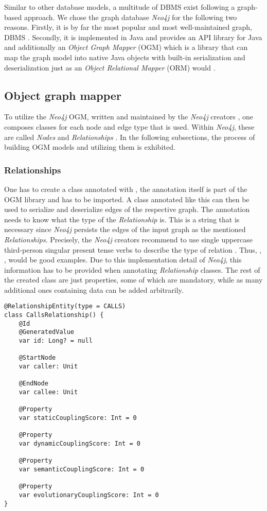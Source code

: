 \documentclass[12pt,a4paper]{report}
\begin{document}
Similar to other database models, a multitude of DBMS exist following a graph\hyp
based approach. We chose the graph database \textit{Neo4j} for the following
two reasons. Firstly, it is by far the most popular and most well-maintained
graph, DBMS \cite{graph-dbms-ranking}. Secondly, it is implemented in Java and
provides an API library for Java and additionally an \textit{Object Graph
Mapper} (OGM) which is a library that can map the graph model into native Java
objects with built-in serialization and deserialization just as an
\textit{Object Relational Mapper} (ORM) would \cite{neo4j-ogm}.


\subsection{Object graph mapper}

To utilize the \textit{Neo4j} OGM, written and maintained by the \textit{Neo4j}
creators \cite{neo4j-ogm}, one composes classes for each node and edge type
that is used. Within \textit{Neo4j}, these are called \textit{Nodes} and
\textit{Relationships} \cite{neo4j-ogm}. In the following subsections, the
process of building OGM models and utilizing them is exhibited.


\subsubsection{Relationships}
One has to create a class annotated with ,
the annotation itself is part of the OGM library and
has to be imported. A class annotated like this can then be used to serialize
and deserialize edges of the respective graph. The annotation needs to know
what the type of the \textit{Relationship} is. This is a string that is
necessary since \textit{Neo4j} persists the edges of the input graph as the
mentioned \textit{Relationships}. Precisely, the \textit{Neo4j} creators
recommend to use single uppercase third-person singular present tense verbs to
describe the type of relation \cite{neo4j-ogm}. Thus, ,
,  would be good examples. Due to this implementation
detail of \textit{Neo4j}, this information has to be provided when annotating
\textit{Relationship} classes. The rest of the created class are just
properties, some of which are mandatory, while as many additional ones
containing data can be added arbitrarily.

\begin{lstlisting}[caption=Relationship OGM class, label=ogm-relationship, breaklines=true]
@RelationshipEntity(type = CALLS)
class CallsRelationship() {
    @Id
    @GeneratedValue
    var id: Long? = null

    @StartNode
    var caller: Unit

    @EndNode
    var callee: Unit

    @Property
    var staticCouplingScore: Int = 0

    @Property
    var dynamicCouplingScore: Int = 0

    @Property
    var semanticCouplingScore: Int = 0

    @Property
    var evolutionaryCouplingScore: Int = 0
}
\end{lstlisting}
\end{document}
